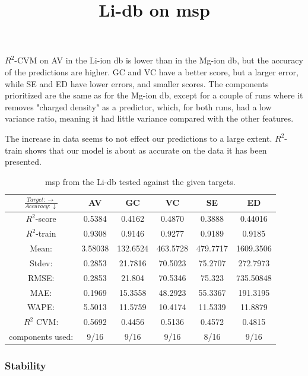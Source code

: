 $R^2$-CVM on AV in the Li-ion db is lower than in the Mg-ion db, but the accuracy of the predictions are higher. GC and VC have a better score, but a larger error, while SE and ED have lower errors, and smaller scores. The components prioritized are the same as for the Mg-ion db, except for a couple of runs where it removes "charged density" as a predictor, which, for both runs, had a low variance ratio, meaning it had little variance compared with the other features.  

The increase in data seems to not effect our predictions to a large extent. $R^2$-train shows that our model is about as accurate on the data it has been presented. 
\FloatBarrier

\begin{table}[h]
\normalsize
\title{Li-db on msp}
\centering
\caption{msp from the Li-db tested against the given targets.}
\begin{tabular}{|c|c|c|c|c|c|}
	\hline 
	$\frac{Target: \rightarrow}{Accuracy:\downarrow} $ & AV & GC & VC & SE & ED  \\ 
	\hline
	$R^2$-score 	& 0.5384 & 0.4162 & 0.4870 & 0.3888 &  0.44016\\ 
	\hline 
	$R^2$-train 	&  0.9308 & 0.9146 & 0.9277 & 0.9189 & 0.9185 \\ 
	\hline
	Mean: 	 &3.58038&132.6524&463.5728&479.7717&1609.3506\\
	\hline 
	Stdev:	 &0.2853	&21.7816	&70.5023	&75.2707&272.7973	\\
	\hline
	RMSE: 	& 0.2853 & 21.804& 70.5346 & 75.323 & 735.50848 \\ 
	\hline 
	MAE: 	&0.1969& 15.3558 &  48.2923 & 55.3367 & 191.3195 \\ 
	\hline
	WAPE: 	& 5.5013 & 11.5759 & 10.4174  & 11.5339 & 11.8879 \\
	\hline
	$R^2$ CVM: &  0.5692 & 0.4456 & 0.5136  & 0.4572 & 0.4815 \\
	\hline
	components used: & 9/16 & 9/16 & 9/16  & 8/16 &9/16 \\
	\hline
\end{tabular}
\label{tab:Li-msp}
\end{table}

\subsubsection*{Stability}

